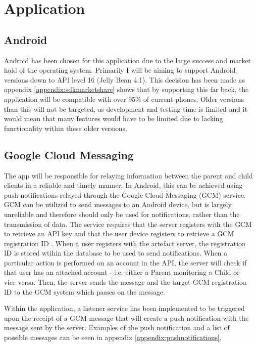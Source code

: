 \section{Application}
\subsection{Android}
Android has been chosen for this application due to the large success and market hold of the operating system.
Primarily I will be aiming to support Android versions down to API level 16 (Jelly Bean 4.1).
This decision has been made as appendix \ref{appendix:sdkmarketshare} shows that by supporting this far back, the application will be compatible with over 95\% of current phones. 
Older versions than this will not be targeted, as development and testing time is limited and it would mean that many features would have to be limited due to lacking functionality within these older versions.

\subsection{Google Cloud Messaging}
The app will be responsible for relaying information between the parent and child clients in a reliable and timely manner.
In Android, this can be achieved using push notifications relayed through the Google Cloud Messaging (GCM) service.
GCM can be utilized to send messages to an Android device, but is largely unreliable \citep{gcmreliability} and therefore should only be used for notifications, rather than the transmission of data.
The service requires that the server registers with the GCM to retrieve an API key and that the user device registers to retrieve a GCM registration ID \citep{gcm}. 
When a user registers with the artefact server, the registration ID is stored wtihin the database to be used to send notifications.
When a particular action is performed on an account in the API, the server will check if that user has an attached account - i.e. either a Parent monitoring a Child or vice versa.
Then, the server sends the message and the target GCM registration ID to the GCM system which passes on the message.

Within the application, a listener service has been implemented to be triggered upon the receipt of a GCM message that will create a push notification with the message sent by the server.
Examples of the push notification and a list of possible messages can be seen in appendix \ref{appendix:pushnotifications}.

